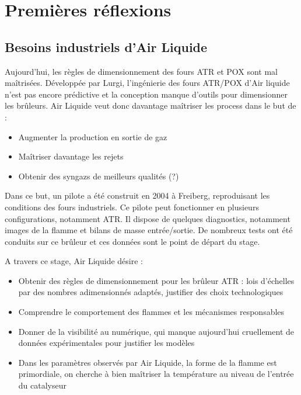 

\renewcommand\evenpagerightmark{{\scshape\small Grid Monitoring}}
\renewcommand\oddpageleftmark{{\scshape\small Chapter 2}}

\renewcommand{\bibname}{References}

\hyphenation{}

\chapter[Premières réflexions]%
{Premières réflexions}
\label{premieres_reflexions}

\section{Besoins industriels d'Air Liquide}
Aujourd'hui, les règles de dimensionnement des fours ATR et POX sont mal maîtrisées. Développée par Lurgi, l'ingénierie des fours ATR/POX d'Air liquide n'est pas encore prédictive et la conception manque d'outils pour dimensionner les brûleurs. Air Liquide veut donc davantage maîtriser les process dans le but de :
\begin{itemize}
\item Augmenter la production en sortie de gaz
\item Maîtriser davantage les rejets
\item Obtenir des syngazs de meilleurs qualités (?)
\end{itemize}

Dans ce but, un pilote a été construit en 2004 à Freiberg, reproduisant les conditions des fours industriels. Ce pilote peut fonctionner en plusieurs configurations, notamment ATR. Il dispose de quelques diagnostics, notamment images de la flamme et bilans de masse entrée/sortie. De nombreux tests ont été conduits sur ce brûleur et ces données sont le point de départ du stage.

A travers ce stage, Air Liquide désire :
\begin{itemize}
\item Obtenir des règles de dimensionnement pour les brûleur ATR : lois d'échelles par des nombres adimensionnés adaptés, justifier des choix technologiques
\item Comprendre le comportement des flammes et les mécanismes responsables
\item Donner de la visibilité au numérique, qui manque aujourd'hui cruellement de données expérimentales pour justifier les modèles
\item Dans les paramètres observés par Air Liquide, la forme de la flamme est primordiale, on cherche à bien maîtriser la température au niveau de l'entrée du catalyseur
\end{itemize}

